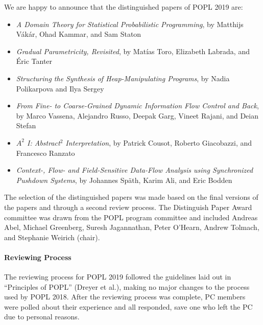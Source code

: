 We are happy to announce that the distinguished papers of POPL 2019 are:

\begin{itemize}
\item {\em A Domain Theory for Statistical Probabilistic Programming}, by 
Matthijs V\'{a}k\'{a}r, Ohad Kammar, and Sam Staton
\item {\em Gradual Parametricity, Revisited}, by
Mat\'{i}as Toro, Elizabeth Labrada, and \'{E}ric Tanter
\item {\em Structuring the Synthesis of Heap-Manipulating Programs}, by 
Nadia Polikarpova and Ilya Sergey
\item {\em From Fine- to Coarse-Grained Dynamic Information Flow Control and
    Back}, by
Marco Vassena, Alejandro Russo, Deepak Garg, Vineet Rajani, and Deian Stefan
\item {\em $A^2$ I: Abstract$^2$ Interpretation}, by 
Patrick Cousot, Roberto Giacobazzi, and Francesco Ranzato
\item {\em Context-, Flow- and Field-Sensitive Data-Flow Analysis using
  Synchronized Pushdown Systems}, by
Johannes Sp\"{a}th, Karim Ali, and Eric Bodden
\end{itemize}

The selection of the distinguished papers was made based on the final versions
of the papers and through a second review process. The Distinguish Paper Award
committee was drawn from the POPL program committee and included Andreas Abel,
Michael Greenberg, Suresh Jagannathan, Peter O'Hearn, Andrew Tolmach, and
Stephanie Weirich (chair).

\paragraph{Reviewing Process}
%
The reviewing process for POPL 2019 followed the guidelines laid out in
``Principles of POPL'' (Dreyer et al.), making no major changes to the process
used by POPL 2018. After the reviewing process was complete, PC members
were polled about their experience and all responded, save one
who left the PC due to personal reasons.

